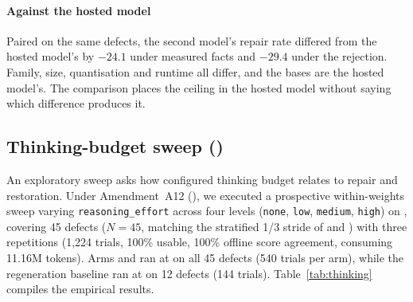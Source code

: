 \paragraph{Against the hosted model}
Paired on the same defects, the second model's repair rate differed from the
hosted model's by $-24.1$\pp{}  under measured facts and
$-29.4$\pp{}  under the rejection. Family, size, quantisation and
runtime all differ, and the bases are the hosted model's. The comparison
places the ceiling in the hosted model without saying which difference
produces it.

\subsection{Thinking-budget sweep ()}
\label{sec:results-thinking}

An exploratory sweep asks how configured thinking budget relates to repair and restoration.
Under Amendment~A12 (), we executed a prospective within-weights sweep
varying \texttt{reasoning\_effort} across four levels (\texttt{none}, \texttt{low},
\texttt{medium}, \texttt{high}) on \model{}, covering 45 defects ($N=45$, matching
the stratified 1/3 stride of  and ) with three repetitions
(1{,}224 trials, 100\% usable, 100\% offline score agreement, consuming 11.16M tokens).
Arms  and  ran at  on all 45 defects (540 trials per arm),
while the regeneration baseline  ran at  on 12 defects (144 trials).
Table~\ref{tab:thinking} compiles the empirical results.

